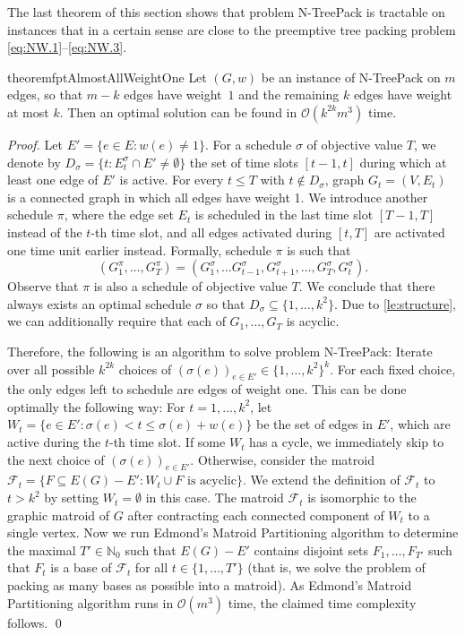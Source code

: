 \documentclass[runningheads]{llncs}
\newcommand{\NN}{\mathbb{N}}
\newcommand{\set}[1]{\{ #1 \}}
\newcommand{\fromto}[2]{\set{#1, \ldots, #2}}
\newcommand{\bigO}{\mathcal{O}}
\newcommand{\xxxNTP}{{\sc N-TreePack}}
\begin{document}
The last theorem of this section shows that problem {\xxxNTP} is tractable on instances that in 
a certain sense are close to the preemptive tree packing problem \eqref{eq:NW.1}--\eqref{eq:NW.3}. 
\begin{restatable}{theorem}{fptAlmostAllWeightOne}
\label{th:fpt_almost_all_weight_one}
Let $(G,w)$ be an instance of {\xxxNTP} on $m$ edges, so that $m-k$ edges have weight~$1$ and 
the remaining $k$ edges have weight at most $k$. 
Then an optimal solution can be found in $\bigO(k^{2k}m^3)$ time.
\end{restatable}
\begin{proof}
Let $E'=\set{e\in E: w(e)\ne1}$. 
For a schedule $\sigma$ of objective value $T$, we denote by $D_\sigma= \set{t: E_t^\sigma\cap E'\ne\emptyset}$ 
the set of time slots $[t-1,t]$ during which at least one edge of $E'$ is active. 
For every $t\le T$ with $t\notin D_\sigma$, graph $G_t=(V,E_t)$ is a connected graph in which 
all edges have weight 1.  
We introduce another schedule $\pi$, where the edge set $E_t$ is scheduled in the last time 
slot $[T-1, T]$ instead of the $t$-th time slot, and all edges activated during $[t, T]$ are activated 
one time unit earlier instead. Formally, schedule $\pi$ is such that
\[(G^\pi_1,\dots, G^\pi_T) = (G^\sigma_1, \dots G^\sigma_{t-1}, G^\sigma_{t+1}, \dots, G^\sigma_T, G^\sigma_t). \]
Observe that $\pi$ is also a schedule of objective value $T$. 
We conclude that there always exists an optimal schedule $\sigma$ so that $D_\sigma \subseteq \fromto{1}{k^2}$. 
Due to \cref{le:structure}, we can additionally require that each of $G_1, \dots, G_T$ is acyclic.

Therefore, the following is an algorithm to solve problem {\xxxNTP}: 
Iterate over all possible $k^{2k}$ choices of $(\sigma(e))_{e \in E'} \in \fromto{1}{k^2}^k$. 
For each fixed choice, the only edges left to schedule are edges of weight one. 
This can be done optimally the following way: 
For $t = 1,\dots, k^2$, let $W_t = \set{e \in E' : \sigma(e) < t \leq \sigma(e) + w(e)}$ be the set of edges in $E'$, which are active during the $t$-th time slot. 
If some $W_t$ has a cycle, we immediately skip to the next choice of $(\sigma(e))_{e \in E'}$. 
Otherwise, consider the matroid $\mathcal{F}_t = \set{F \subseteq E(G)-E' : W_t \cup F \text{ is acyclic}}$. 
We extend the definition of $\mathcal{F}_t$ to $t > k^2$ by setting $W_t = \emptyset$ in this case. 
The matroid $\mathcal{F}_t$ is isomorphic to the graphic matroid of $G$ after contracting each connected 
component of $W_t$ to a single vertex. 
Now we run Edmond's Matroid Partitioning algorithm \cite{edmonds1965minimum} to determine the 
maximal $T'\in\NN_0$ such that $E(G)-E'$ contains disjoint sets $F_1, \dots, F_{T'}$ such that $F_t$ 
is a base of $\mathcal{F}_t$ for all $t \in \fromto{1}{T'}$ (that is, we solve the problem of packing as 
many bases as possible into a matroid). 
As Edmond's Matroid Partitioning algorithm runs in $\bigO(m^3)$ time, the claimed time complexity follows.
\qed
\end{proof}
\end{document}

